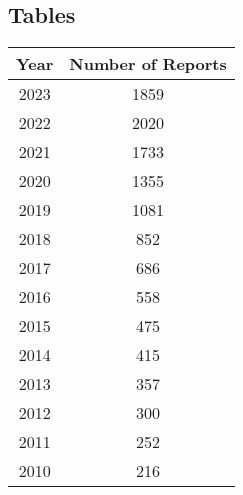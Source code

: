 \documentclass[12pt]{article}
\begin{document}
\subsection{Tables}
\small
\centering

\begin{table}[h]
    \label{tab:sust_reps}
    \centering
        \begin{tabular}{cc}
            \toprule
            Year & Number of Reports\\
            \midrule
            2023 & 1859\\
            2022 & 2020\\
            2021 & 1733\\
            2020 & 1355\\
            2019 & 1081\\
            2018 & 852\\
            2017 & 686\\
            2016 & 558\\
            2015 & 475\\
            2014 & 415\\
            2013 & 357\\
            2012 & 300\\
            2011 & 252\\
            2010 & 216\\
            \bottomrule
        \end{tabular}
\end{table}

\pagebreak
\end{document}
